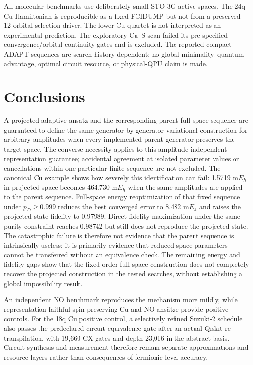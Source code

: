 \documentclass[
 aip,
 jcp,
 amsmath,amssymb,
 preprint
]{revtex4-2}
\begin{document}
All molecular benchmarks use deliberately small STO-3G active spaces.
The 24q Cu Hamiltonian is reproducible as a fixed FCIDUMP but not from a preserved 12-orbital selection driver.
The lower Cu quartet is not interpreted as an experimental prediction.
The exploratory Cu--S scan failed its pre-specified convergence/orbital-continuity gates and is excluded.
The reported compact ADAPT sequences are search-history dependent; no global minimality, quantum advantage, optimal circuit resource, or physical-QPU claim is made.

\section{Conclusions}

A projected adaptive ansatz and the corresponding parent full-space sequence are guaranteed to define the same generator-by-generator variational construction for arbitrary amplitudes when every implemented parent generator preserves the target space.
The converse necessity applies to this amplitude-independent representation guarantee; accidental agreement at isolated parameter values or cancellations within one particular finite sequence are not excluded.
The canonical Cu example shows how severely this identification can fail: 1.5719 m$E_h$ in projected space becomes 464.730 m$E_h$ when the same amplitudes are applied to the parent sequence.
Full-space energy reoptimization of that fixed sequence under $p_D\ge0.999$ reduces the best converged error to 8.482 m$E_h$ and raises the projected-state fidelity to 0.97989.
Direct fidelity maximization under the same purity constraint reaches 0.98742 but still does not reproduce the projected state.
The catastrophic failure is therefore not evidence that the parent sequence is intrinsically useless; it is primarily evidence that reduced-space parameters cannot be transferred without an equivalence check.
The remaining energy and fidelity gaps show that the fixed-order full-space construction does not completely recover the projected construction in the tested searches, without establishing a global impossibility result.

An independent NO benchmark reproduces the mechanism more mildly, while representation-faithful spin-preserving Cu and NO ans\"atze provide positive controls.
For the 18q Cu positive control, a selectively refined Suzuki-2 schedule also passes the predeclared circuit-equivalence gate after an actual Qiskit re-transpilation, with 19,660 CX gates and depth 23,016 in the abstract basis.
Circuit synthesis and measurement therefore remain separate approximations and resource layers rather than consequences of fermionic-level accuracy.
\end{document}
